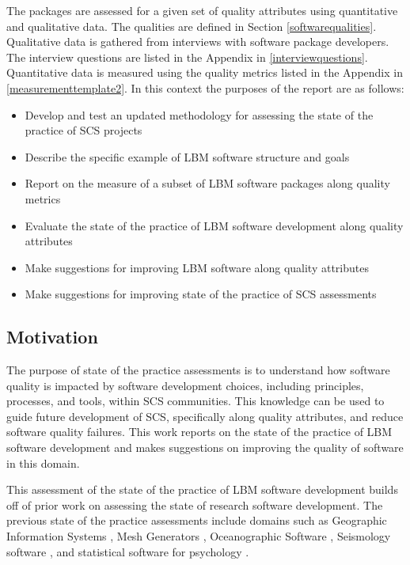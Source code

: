 \documentclass[12pt, notitlepage]{article}
\begin{document}
The packages are assessed for a given set of quality attributes using quantitative and qualitative data. The qualities are defined in Section \ref{softwarequalities}. Qualitative data is gathered from interviews with software package developers. The interview questions are listed in the Appendix in \ref{interviewquestions}. Quantitative data is measured using the quality metrics listed in the Appendix in \ref{measurementtemplate2}. In this context the purposes of the report are as follows:

\begin{itemize}
	\item Develop and test an updated methodology for assessing the state of the practice of SCS projects
	\item Describe the specific example of LBM software structure and goals
	\item Report on the measure of a subset of LBM software packages along quality metrics
	\item Evaluate the state of the practice of LBM software development along quality attributes
	\item Make suggestions for improving LBM software along quality attributes
	\item Make suggestions for improving state of the practice of SCS assessments
\end{itemize}

\subsection{Motivation}

The purpose of state of the practice assessments is to understand how software quality is impacted by software development choices, including principles, processes, and tools, within SCS communities. This knowledge can be used to guide future development of SCS, specifically along quality attributes, and reduce software quality failures. This work reports on the state of the practice of LBM software development and makes suggestions on improving the quality of software in this domain.

This assessment of the state of the practice of LBM software development builds off of prior work on assessing the state of research software development. The previous state of the practice assessments include domains such as Geographic Information Systems \citep{SmithEtAl2018_arXivGIS}, Mesh Generators \citep{SmithEtAl2016}, Oceanographic Software \citep{smith2015state}, Seismology software \citep{SmithEtAl2018}, and statistical software for psychology \citep{SmithEtAl2018_StatSoft}. 
\end{document}
